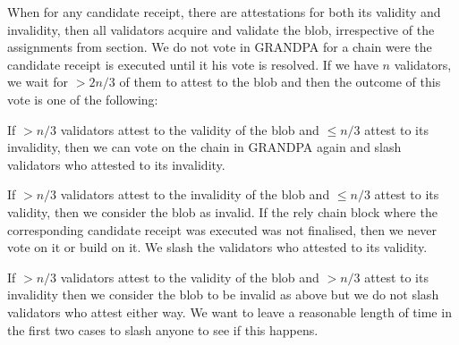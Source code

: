 When for any candidate receipt, there are attestations for both its validity and invalidity, then all validators acquire and validate the blob, irrespective of the assignments from section. We do not vote in GRANDPA for a chain were the candidate receipt is executed until it his vote is resolved. If we have $n$ validators, we wait for $>2n/3$ of them to attest to the blob and then the outcome of this vote is one of the following:

If $>n/3$ validators attest to the validity of the blob and $\leq n/3$ attest to its invalidity, then we can vote on the chain in GRANDPA again and slash validators who attested to its invalidity.

If $>n/3$ validators attest to the invalidity of the blob and $\leq n/3$ attest to its validity, then we consider the blob as invalid. If the rely chain block where the corresponding candidate receipt was executed was not finalised, then we never vote on it or build on it. We slash the validators who attested to its validity.

If $>n/3$ validators attest to the validity of the blob and $>n/3$ attest to its invalidity then we consider the blob to be invalid as above but we do not slash validators who attest either way. We want to leave a reasonable length of time in the first two cases to slash anyone to see if this happens.

